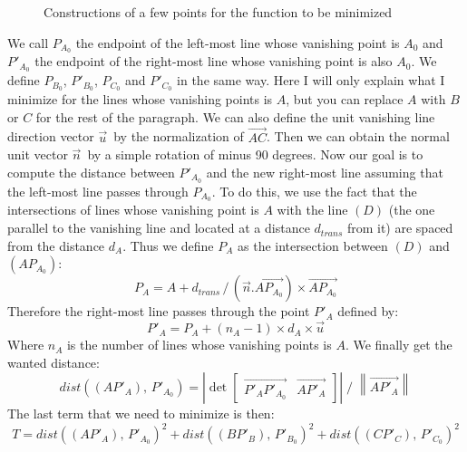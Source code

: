 \documentclass[11pt]{article}
\begin{document}
\begin{figure}[h]
		\vspace{-5mm}
		\caption{Constructions of a few points for the function to be minimized}
		\label{im:cons}
	\end{figure}

	We call $P_{A_0}$ the endpoint of the left-most line whose vanishing point is $A_0$ and $P'_{A_0}$ the endpoint of the right-most line whose vanishing point is also $A_0$. We define $P_{B_0}$, $P'_{B_0}$, $P_{C_0}$ and $P'_{C_0}$ in the same way. Here I will only explain what I minimize for the lines whose vanishing points is $A$, but you can replace $A$ with $B$ or $C$ for the rest of the paragraph. We can also define the unit vanishing line direction vector $\vec{u} \,$ by the normalization of $\overrightarrow{AC}$. Then we can obtain the normal unit vector $\vec{n} \,$ by a simple rotation of minus 90 degrees. Now our goal is to compute the distance between $P'_{A_0}$ and the new right-most line assuming that the left-most line passes through $P_{A_0}$. To do this, we use the fact that the intersections of lines whose vanishing point is $A$ with the line $(D)$ (the one parallel to the vanishing line and located at a distance $d_{trans}$ from it) are spaced from the distance $d_A$. Thus we define $P_A$ as the intersection between $(D)$ and $(A P_{A_0})$:
	$$ P_A = A + d_{trans} \, / \, \left( \vec{n} . \overrightarrow{A P_{A_0}} \right) \times \overrightarrow{A P_{A_0}} $$
	Therefore the right-most line passes through the point $P'_A$ defined by:
	$$ P'_A = P_A + (n_A - 1) \times d_A \times \vec{u} $$
	Where $n_A$ is the number of lines whose vanishing points is $A$. We finally get the wanted distance:
	$$ dist \left( (A P'_A), \, P'_{A_0} \right) = \left| \det \begin{bmatrix} \overrightarrow{P'_A P'_{A_0}} & \overrightarrow{A P'_A} \end{bmatrix} \right| \; / \; \left\| \overrightarrow{A P'_A} \right\| $$
	The last term that we need to minimize is then:
	\begin{equation}
		\label{eq:T}
		T = dist \left( (A P'_A), \, P'_{A_0} \right)^2 + dist \left( (B P'_B), \, P'_{B_0} \right)^2 + dist \left( (C P'_C), \, P'_{C_0} \right)^2
	\end{equation}
	
\end{document}
